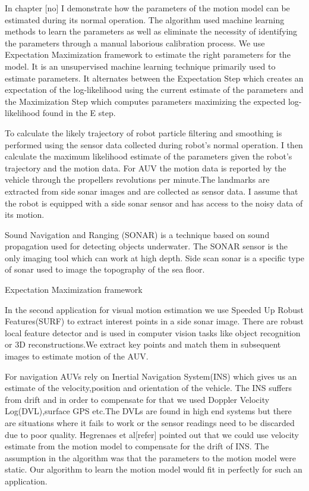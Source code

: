 \documentclass[12pt]{dalcsthesis}
\begin{document}
In chapter [no] I demonstrate how the parameters of the motion model can be estimated during its normal operation. The algorithm used machine learning methods to learn the parameters as well as eliminate the necessity of identifying the parameters through a manual laborious calibration process. We use Expectation Maximization \cite{dempster1977maximum} framework to estimate the right parameters for the model. It is an unsupervised machine learning technique primarily used to estimate parameters. It alternates between the Expectation Step which creates an expectation of the log-likelihood using the current estimate of the parameters and the Maximization Step which computes parameters maximizing the expected log-likelihood found in the E step. 

To calculate the likely trajectory of robot particle filtering and smoothing is performed using the sensor data collected during robot's normal operation. I then calculate the maximum likelihood estimate of the parameters given the robot's trajectory and the motion data. For AUV the motion data is reported by the vehicle through the propellers revolutions per minute.The landmarks are extracted from side sonar images and are collected as sensor data. I assume that the robot is equipped with a side sonar sensor and has access to the noisy data of its motion.

Sound Navigation and Ranging (SONAR) is a technique based on sound propagation used for detecting objects underwater. The SONAR sensor is the only imaging tool which can work at high depth. Side scan sonar is a specific type of sonar used to image the topography of the sea floor. 


Expectation Maximization framework \cite{dempster1977maximum} 



In the second application for visual motion estimation we use Speeded Up Robust Features(SURF) to extract interest points in a side sonar image. There are robust local feature detector and is used in computer vision tasks like object recognition or 3D reconstructions.We extract key points and match them in subsequent images to estimate motion of the AUV.

For navigation AUVs rely on Inertial Navigation System(INS) which gives us an estimate of the velocity,position and orientation of the vehicle. The INS suffers from drift and in order to compensate for that we used Doppler Velocity Log(DVL),surface GPS etc.The DVLs are found in high end systems but there are situations where it fails to work or the sensor readings need to be discarded due to poor quality. Hegrenaes et al[refer] pointed out that we could use velocity estimate from the motion model to compensate for the drift of INS. The assumption in the algorithm was that the parameters to the motion model were static. Our algorithm to learn the motion model would fit in perfectly for such an application. 
\end{document}
